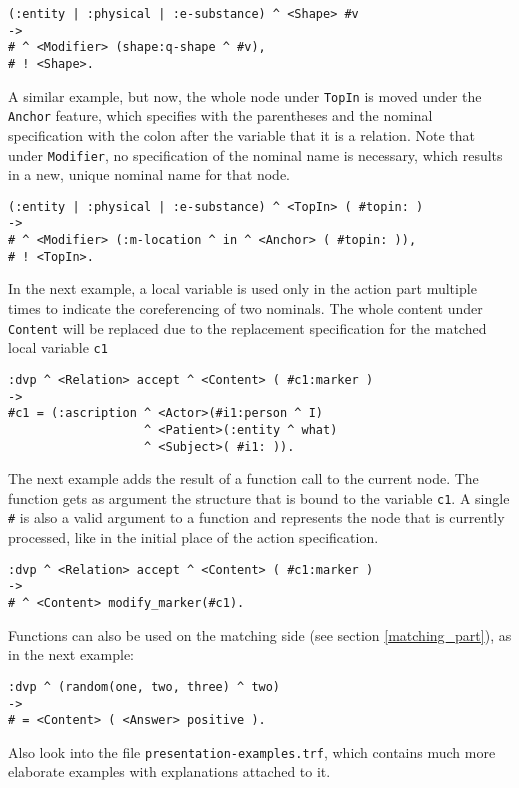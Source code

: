 \documentclass[11pt,a4paper]{report}
\newcommand{\cd}[1]{\texttt{#1}}
\begin{document}
\begin{verbatim}
(:entity | :physical | :e-substance) ^ <Shape> #v
->
# ^ <Modifier> (shape:q-shape ^ #v),
# ! <Shape>.
\end{verbatim}

A similar example, but now, the whole node under \cd{TopIn} is moved under the
\cd{Anchor} feature, which specifies with the parentheses and the nominal
specification with the colon after the variable that it is a relation.
Note that under \cd{Modifier}, no specification of the nominal name is
necessary, which results in a new, unique nominal name for that node.

\begin{verbatim}
(:entity | :physical | :e-substance) ^ <TopIn> ( #topin: )
->
# ^ <Modifier> (:m-location ^ in ^ <Anchor> ( #topin: )),
# ! <TopIn>.
\end{verbatim}

In the next example, a local variable is used only in the action part multiple
times to indicate the coreferencing of two nominals. The whole content under
\cd{Content} will be replaced due to the replacement specification for the
matched local variable \cd{c1}

\begin{verbatim}
:dvp ^ <Relation> accept ^ <Content> ( #c1:marker )
->
#c1 = (:ascription ^ <Actor>(#i1:person ^ I)
                   ^ <Patient>(:entity ^ what)
                   ^ <Subject>( #i1: )).
\end{verbatim}

The next example adds the result of a function call to the current node. The
function gets as argument the structure that is bound to the variable
\texttt{c1}. A single \texttt{\#} is also a valid argument to a function and
represents the node that is currently processed, like in the initial place of
the action specification.

\begin{verbatim}
:dvp ^ <Relation> accept ^ <Content> ( #c1:marker )
->
# ^ <Content> modify_marker(#c1).
\end{verbatim}

Functions can also be used on the matching side (see section
\ref{matching_part}), as in the next example:

\begin{verbatim}
:dvp ^ (random(one, two, three) ^ two)
->
# = <Content> ( <Answer> positive ).
\end{verbatim}

Also look into the file \texttt{presentation-examples.trf}, which contains
much more elaborate examples with explanations attached to it.
\end{document}
